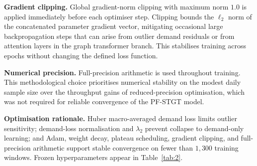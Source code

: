 \textbf{Gradient clipping.} Global gradient-norm clipping with maximum norm \(1.0\) is applied immediately before each optimiser step. Clipping bounds the \(\ell_2\) norm of the concatenated parameter gradient vector, mitigating occasional large backpropagation steps that can arise from outlier demand residuals or from attention layers in the graph transformer branch. This stabilises training across epochs without changing the defined loss function.

\textbf{Numerical precision.} Full-precision arithmetic is used throughout training. This methodological choice prioritises numerical stability on the modest daily sample size over the throughput gains of reduced-precision optimisation, which was not required for reliable convergence of the PF-STGT model.

\textbf{Optimisation rationale.} Huber macro-averaged demand loss limits outlier sensitivity; demand-loss normalisation and \(\lambda_2\) prevent collapse to demand-only learning; and Adam, weight decay, plateau scheduling, gradient clipping, and full-precision arithmetic support stable convergence on fewer than \(1{,}300\) training windows. Frozen hyperparameters appear in Table~\ref{tab:2}.






